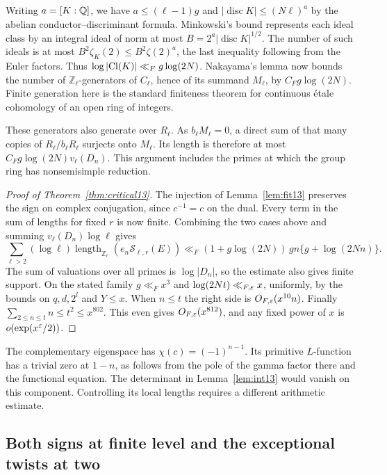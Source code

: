\documentclass[a4paper,11pt]{article}
\theoremstyle{definition}
\theoremstyle{remark}
\newcommand{\ZZ}{\mathbb Z}\newcommand{\ord}{\operatorname{ord}}
\newcommand{\len}{\operatorname{length}}\newcommand{\Res}{\operatorname*{Res}}
\numberwithin{equation}{section}
\begin{document}
Writing \(a=[K:\mathbb Q]\), we have \(a\le(\ell-1)g\) and \(|\operatorname{disc}K|\le(N\ell)^a\) by the abelian conductor--discriminant formula. Minkowski's bound represents each ideal class by an integral ideal of norm at most \(B=2^a|\operatorname{disc}K|^{1/2}\). The number of such ideals is at most \(B^2\zeta_K(2)\le B^2\zeta(2)^a\), the last inequality following from the Euler factors. Thus \(\log|{\rm Cl}(K)|\ll_F g\log(2N)\). Nakayama's lemma now bounds the number of \(\ZZ_\ell\)-generators of \(C_\ell\), hence of its summand \(M_\ell\), by \(C_Fg\log(2N)\). Finite generation here is the standard finiteness theorem for continuous étale cohomology of an open ring of integers.~\cite{II-II-II-gp13}

These generators also generate over \(R_\ell\). As \(b_\ell M_\ell=0\), a direct sum of that many copies of \(R_\ell/b_\ell R_\ell\) surjects onto \(M_\ell\). Its length is therefore at most \(C_Fg\log(2N)v_\ell(D_n)\). This argument includes the primes at which the group ring has nonsemisimple reduction.

\begin{proof}[Proof of Theorem~\ref{thm:critical13}]
The injection of Lemma~\ref{lem:fit13} preserves the sign on complex conjugation, since \(c^{-1}=c\) on the dual. Every term in the sum of lengths for fixed \(r\) is now finite. Combining the two cases above and summing \(v_\ell(D_n)\log\ell\) gives
\[
 \sum_{\ell>2}(\log\ell)\len_{\ZZ_\ell}(e_n\mathcal S_{\ell,r}(E))
 \ll_F (1+g\log(2N))\,gn\{g+\log(2Nn)\}.
\]
The sum of valuations over all primes is \(\log|D_n|\), so the estimate also gives finite support. On the stated family \(g\ll_F x^3\) and \(\log(2Nt)\ll_{F,\varepsilon} x\), uniformly, by the bounds on \(q,d,2^l\) and \(Y\le x\). When \(n\le t\) the right side is \(O_{F,\varepsilon}(x^{10}n)\). Finally \(\sum_{2\le n\le t}n\le t^2\le x^{802}\). This even gives \(O_{F,\varepsilon}(x^{812})\), and any fixed power of \(x\) is \(o(\exp(x^\varepsilon/2))\).
\end{proof}
The complementary eigenspace has \(\chi(c)=(-1)^{n-1}\). Its primitive \(L\)-function has a trivial zero at \(1-n\), as follows from the pole of the gamma factor there and the functional equation. The determinant in Lemma~\ref{lem:int13} would vanish on this component. Controlling its local lengths requires a different arithmetic estimate.

\subsection{Both signs at finite level and the exceptional twists at two}\label{nav:II-08}
\label{sec:two15}
\end{document}
